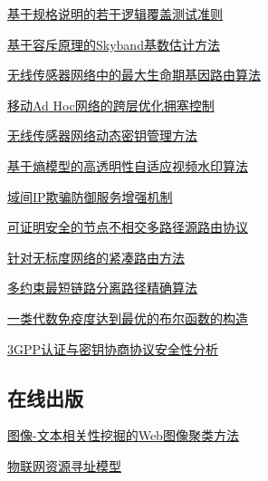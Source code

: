 \documentclass[a4paper]{article}
\begin{document}
\href{http://www.jos.org.cn/ch/reader/download_pdf.aspx?file_no=3615&year_id=2010&quarter_id=7&falg=1}{基于规格说明的若干逻辑覆盖测试准则}

\href{http://www.jos.org.cn/ch/reader/download_pdf.aspx?file_no=3622&year_id=2010&quarter_id=7&falg=1}{基于容斥原理的Skyband基数估计方法}

\href{http://www.jos.org.cn/ch/reader/download_pdf.aspx?file_no=3601&year_id=2010&quarter_id=7&falg=1}{无线传感器网络中的最大生命期基因路由算法}

\href{http://www.jos.org.cn/ch/reader/download_pdf.aspx?file_no=3803&year_id=2010&quarter_id=7&falg=1}{移动Ad Hoc网络的跨层优化拥塞控制}

\href{http://www.jos.org.cn/ch/reader/download_pdf.aspx?file_no=3585&year_id=2010&quarter_id=7&falg=1}{无线传感器网络动态密钥管理方法}

\href{http://www.jos.org.cn/ch/reader/download_pdf.aspx?file_no=3569&year_id=2010&quarter_id=7&falg=1}{基于熵模型的高透明性自适应视频水印算法}

\href{http://www.jos.org.cn/ch/reader/download_pdf.aspx?file_no=3573&year_id=2010&quarter_id=7&falg=1}{域间IP欺骗防御服务增强机制}

\href{http://www.jos.org.cn/ch/reader/download_pdf.aspx?file_no=3576&year_id=2010&quarter_id=7&falg=1}{可证明安全的节点不相交多路径源路由协议}

\href{http://www.jos.org.cn/ch/reader/download_pdf.aspx?file_no=3582&year_id=2010&quarter_id=7&falg=1}{针对无标度网络的紧凑路由方法}

\href{http://www.jos.org.cn/ch/reader/download_pdf.aspx?file_no=3589&year_id=2010&quarter_id=7&falg=1}{多约束最短链路分离路径精确算法}

\href{http://www.jos.org.cn/ch/reader/download_pdf.aspx?file_no=3731&year_id=2010&quarter_id=7&falg=1}{一类代数免疫度达到最优的布尔函数的构造}

\href{http://www.jos.org.cn/ch/reader/download_pdf.aspx?file_no=3527&year_id=2010&quarter_id=7&falg=1}{3GPP认证与密钥协商协议安全性分析}

\subsection{在线出版}
\href{http://www.jos.org.cn/ch/reader/download_pdf.aspx?file_no=3704&year_id=2010&quarter_id=7&falg=1}{图像-文本相关性挖掘的Web图像聚类方法}

\href{http://www.jos.org.cn/ch/reader/download_pdf.aspx?file_no=3614&year_id=2010&quarter_id=7&falg=1}{物联网资源寻址模型}
\end{document}
